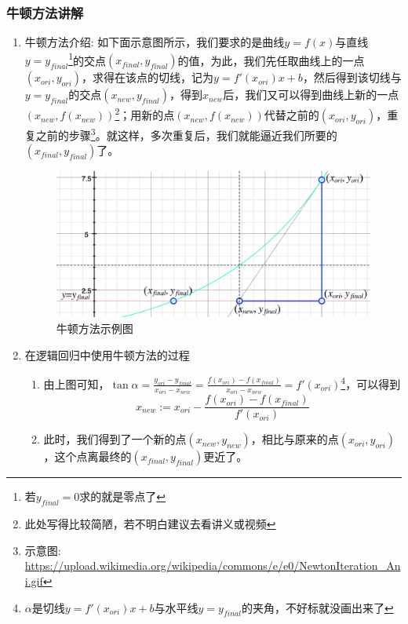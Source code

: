 \subsubsection{牛顿方法讲解}
\begin{enumerate}
	\item 牛顿方法介绍: 如下面示意图所示，我们要求的是曲线$y=f(x)$与直线$y=y_{final}$\footnote{若$y_{final}=0$求的就是零点了}的交点$(x_{final}, y_{final})$的值，为此，我们先任取曲线上的一点$(x_{ori}, y_{ori})$，求得在该点的切线，记为$y=f'(x_{ori})x + b$，然后得到该切线与$y=y_{final}$的交点$(x_{new}, y_{final})$，得到$x_{new}$后，我们又可以得到曲线上新的一点$(x_{new}, f(x_{new}))$\footnote{此处写得比较简陋，若不明白建议去看讲义或视频}；用新的点$(x_{new}, f(x_{new}))$代替之前的$(x_{ori}, y_{ori})$，重复之前的步骤\footnote{示意图: \url{https://upload.wikimedia.org/wikipedia/commons/e/e0/NewtonIteration_Ani.gif}}。就这样，多次重复后，我们就能逼近我们所要的$(x_{final}, y_{final})$了。
	\begin{figure}[htbp]
		\centering
		\includegraphics[scale=0.5]{./images/牛顿方法示例图片}
		\caption{牛顿方法示例图}
	\end{figure}

	\item 在逻辑回归中使用牛顿方法的过程
	\begin{enumerate}
		\item 由上图可知，$\tan\alpha = \frac{y_{ori}-y_{final}}{x_{ori}-x_{new}} = \frac{f(x_{ori})-f(x_{final})}{x_{ori}-x_{new}} = f'(x_{ori})$\footnote{$\alpha$是切线$y=f'(x_{ori})x + b$与水平线$y=y_{final}$的夹角，不好标就没画出来了}，可以得到
		\begin{equation}
			x_{new} := x_{ori} - \frac{f(x_{ori})-f(x_{final})}{f'(x_{ori})}
		\end{equation}
		
		\item 此时，我们得到了一个新的点$(x_{new}, y_{new})$，相比与原来的点$(x_{ori},y_{ori})$，这个点离最终的$(x_{final}, y_{final})$更近了。


\end{enumerate}
\end{enumerate}
